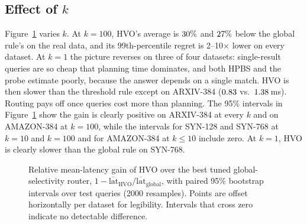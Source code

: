 \documentclass[sigconf, nonacm]{acmart}
\begin{document}
\subsection{Effect of $k$}\label{sec:eval_more}
Figure~\ref{fig:gainci} varies $k$. At $k=100$, HVO's average is $30\%$ and $27\%$ below the global rule's on the real data, and its 99th-percentile regret is 2--10$\times$ lower on every dataset. At $k=1$ the picture reverses on three of four datasets: single-result queries are so cheap that planning time dominates, and both HPBS and the probe estimate poorly, because the answer depends on a single match. HVO is then slower than the threshold rule except on ARXIV-384 ($0.83$ vs.\ $1.38$\,ms). Routing pays off once queries cost more than planning. The 95\% intervals in Figure~\ref{fig:gainci} show the gain is clearly positive on ARXIV-384 at every $k$ and on AMAZON-384 at $k=100$, while the intervals for SYN-128 and SYN-768 at $k=10$ and $k=100$ and for AMAZON-384 at $k\le10$ include zero. At $k=1$, HVO is clearly slower than the global rule on SYN-768.

\begin{figure}[!t]
\centering
{}
\caption{Relative mean-latency gain of HVO over the best tuned global-selectivity router, $1-\overline{\text{lat}}_{\text{HVO}}/\overline{\text{lat}}_{\text{global}}$, with paired 95\% bootstrap intervals over test queries (2000 resamples). Points are offset horizontally per dataset for legibility. Intervals that cross zero indicate no detectable difference.}
\label{fig:gainci}
\end{figure}
\end{document}
